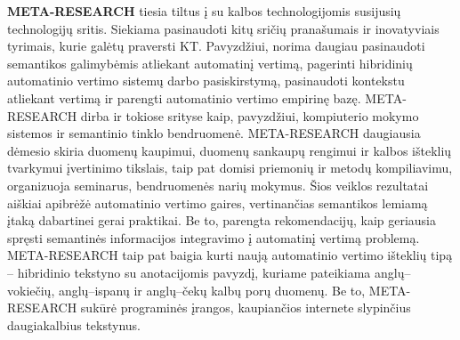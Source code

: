 \documentclass[]{../metanetpaper}
\begin{document}
\begin{multicols}{2}
\textbf{META-RESEARCH} tiesia tiltus į su kalbos technologijomis susijusių technologijų sritis. Siekiama pasinaudoti kitų sričių pranašumais ir inovatyviais tyrimais, kurie galėtų praversti KT. Pavyzdžiui, norima daugiau pasinaudoti semantikos galimybėmis atliekant automatinį vertimą, pagerinti hibridinių automatinio vertimo sistemų darbo pasiskirstymą, pasinaudoti kontekstu atliekant vertimą ir parengti automatinio vertimo empirinę bazę. META-RESEARCH dirba ir tokiose srityse kaip, pavyzdžiui, kompiuterio mokymo sistemos ir semantinio tinklo bendruomenė. META-RESEARCH daugiausia dėmesio skiria duomenų kaupimui, duomenų sankaupų rengimui ir kalbos išteklių tvarkymui įvertinimo tikslais, taip pat domisi priemonių ir metodų kompiliavimu, organizuoja seminarus, bendruomenės narių mokymus. Šios veiklos rezultatai aiškiai apibrėžė automatinio vertimo gaires, vertinančias semantikos lemiamą įtaką dabartinei gerai praktikai. Be to, parengta rekomendacijų, kaip geriausia spręsti semantinės informacijos integravimo į automatinį vertimą problemą. META-RESEARCH taip pat baigia kurti naują automatinio vertimo išteklių tipą – hibridinio tekstyno su anotacijomis pavyzdį, kuriame pateikiama anglų–vokiečių, anglų–ispanų ir anglų–čekų kalbų porų duomenų. Be to, META-RESEARCH sukūrė programinės įrangos, kaupiančios internete slypinčius daugiakalbius tekstynus.
\end{multicols}


\setcounter{section}{0}
\setcounter{figure}{0}

\cleardoublepage


\end{document}
